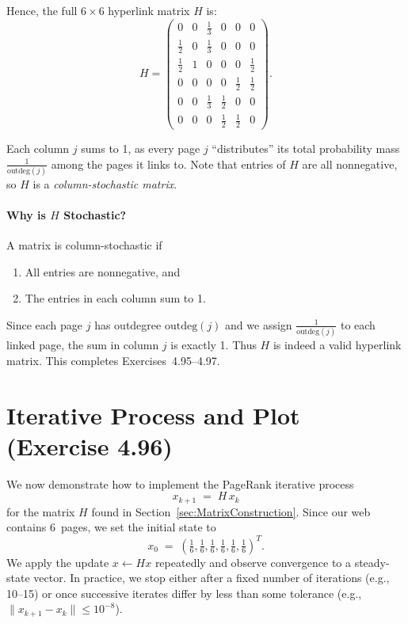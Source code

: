 \documentclass{article}
\begin{document}
Hence, the full $6 \times 6$ hyperlink matrix $H$ is:
\[
H 
= 
\begin{pmatrix}
0      & 0      & \tfrac{1}{3} & 0          & 0          & 0 \\
\tfrac{1}{2} & 0      & \tfrac{1}{3} & 0          & 0          & 0 \\
\tfrac{1}{2} & 1      & 0           & 0          & 0          & \tfrac{1}{2} \\
0      & 0      & 0           & 0          & \tfrac{1}{2} & \tfrac{1}{2} \\
0      & 0      & \tfrac{1}{3} & \tfrac{1}{2} & 0          & 0 \\
0      & 0      & 0           & \tfrac{1}{2} & \tfrac{1}{2} & 0
\end{pmatrix}.
\]

\noindent
Each column $j$ sums to 1, as every page $j$ ``distributes'' its total probability mass $\tfrac{1}{\text{outdeg}(j)}$ 
among the pages it links to. Note that entries of $H$ are all nonnegative, so $H$ is a \emph{column-stochastic matrix}.

\paragraph{Why is $H$ Stochastic?}
A matrix is column-stochastic if
\begin{enumerate}
  \item All entries are nonnegative, and 
  \item The entries in each column sum to 1.
\end{enumerate}
Since each page $j$ has outdegree $\text{outdeg}(j)$ and we assign $\tfrac{1}{\text{outdeg}(j)}$ to each linked page, the sum 
in column $j$ is exactly 1. Thus $H$ is indeed a valid hyperlink matrix. This completes Exercises~4.95--4.97.


\section{Iterative Process and Plot (Exercise 4.96)}

We now demonstrate how to implement the PageRank iterative process 
\[
x_{k+1} \;=\; H \, x_{k}
\]
for the matrix \(H\) found in Section~\ref{sec:MatrixConstruction}. 
Since our web contains 6~pages, we set the initial state to
\[
x_0 \;=\; \left(\tfrac{1}{6}, \tfrac{1}{6}, \tfrac{1}{6}, \tfrac{1}{6}, 
\tfrac{1}{6}, \tfrac{1}{6}\right)^T.
\]
We apply the update \(x \leftarrow Hx\) repeatedly and observe convergence 
to a steady-state vector. In practice, we stop either after a fixed number of 
iterations (e.g., 10--15) or once successive iterates differ by less than 
some tolerance (e.g., \(\|x_{k+1} - x_k\|\le 10^{-8}\)).
\end{document}
